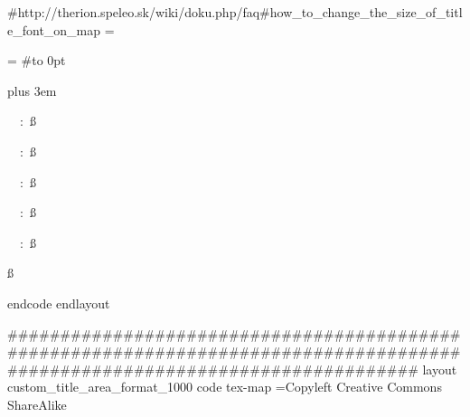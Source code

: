   #http://therion.speleo.sk/wiki/doku.php/faq#how_to_change_the_size_of_title_font_on_map
    \legendcontent={%
      \hsize=\legendwidth
      #\ifnortharrow\vbox to 0pt{\line{\hfil\northarrow}\vss}\fi
      \edef\tmp{\the\cavename} \ifx\tmp\empty \else
         {\size[44]\the\cavename} \vskip1cm
      \fi
      \ifscalebar\scalebar\vskip1cm\fi
      {\rightskip=0pt plus 3em\parskip=3bp
        \edef\tmp{\the\comment} \ifx\tmp\empty \else
           {\size[20]\the\comment} \par\medskip
         \fi
      \edef\tmp{\the\cavelength} \ifx\tmp\empty \else
        {\size[20]\si\the\cavelengthtitle: \ss\the\cavelength\par}
      \fi
      \edef\tmp{\the\cavedepth} \ifx\tmp\empty \else
        {\size[20]\si\the\cavedepthtitle: \ss\the\cavedepth\par}
      \fi
      \edef\tmp{\the\exploteam} \ifx\tmp\empty \else
        {\size[20]\si\the\explotitle:
        \ss\the\exploteam\quad\si\the\explodate\par}
      \fi
      \edef\tmp{\the\topoteam} \ifx\tmp\empty \else
        {\size[20]\si\the\topotitle: \ss\the\topoteam\quad\si\the\topodate\par}
      \fi
      \edef\tmp{\the\cartoteam} \ifx\tmp\empty \else
        {\size[20]\si\the\cartotitle:
        \ss\the\cartoteam\quad\si\the\cartodate\par}
      \fi
      \edef\tmp{\the\copyrights} \ifx\tmp\empty \else
        {\size[20]\ss\the\copyrights\par}
      \fi
     }
  }
  endcode
endlayout

#############################################################################################################################
layout custom_title_area_format_1000
  code tex-map
  \copyrights={Copyleft Creative Commons ShareAlike}
  

